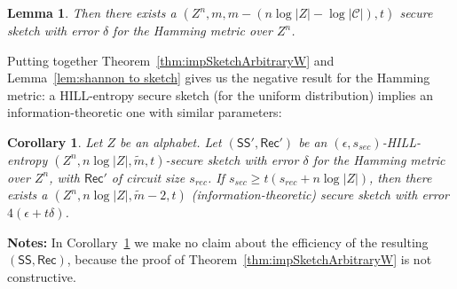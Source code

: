 \documentclass[11pt]{article}
\newcommand{\thref}[1]{\mbox{Theorem~\ref{#1}}}
\newcommand{\corref}[1]{\mbox{Corollary~\ref{#1}}}
\newcommand{\lemref}[1]{\mbox{Lemma~\ref{#1}}}
\newcommand{\class}[1]{{\ensuremath{\mathsf{#1}}}}
\newcommand{\sketch}{\ensuremath{\class{SS}}\xspace}
\newcommand{\rec}{\ensuremath{\class{Rec}}\xspace}
\newcommand{\hill}{\ensuremath{\mathtt{HILL}}\xspace}
\newcommand{\Hoo}{\mathrm{H}_\infty}
\newcommand{\Hav}{\tilde{\mathrm{H}}_\infty}
\newtheorem{lemma}[theorem]{Lemma}
\newtheorem{corollary}[theorem]{Corollary}
\newtheorem{construction}[theorem]{Construction}
\begin{document}
\begin{lemma}
Then there exists a $(Z^n, m, m-(n\log|Z|-\log |\mathcal{C}|), t)$ secure sketch with error $\delta$ for the Hamming metric over $Z^n$. 
\end{lemma}
Putting together \thref{thm:impSketchArbitraryW} and \lemref{lem:shannon to sketch} gives us the negative result for the Hamming metric: a HILL-entropy secure sketch (for the uniform distribution) implies an information-theoretic one with similar parameters:
\begin{corollary}
\label{cor:rec yields sketch}
Let $Z$ be an alphabet. Let $(\sketch', \rec')$ be an $(\epsilon,s_{sec})$-HILL-entropy $(Z^n, n\log |Z|, \tilde{m}, t)$-secure sketch with error $\delta$ for the Hamming metric over $Z^n$, with $\rec'$ of circuit size $s_{rec}$.
If $s_{sec}\geq t(s_{rec} + n\log |Z|)$, then there exists a   $(Z^n, n\log |Z|, \tilde{m}-2,t)$ (information-theoretic) secure sketch with error
$4(\epsilon+t\delta)$. 
\end{corollary}
\textbf{Notes:} In \corref{cor:rec yields sketch} we make no claim about the efficiency of the resulting  $(\sketch, \rec)$, because the proof of \thref{thm:impSketchArbitraryW} is not constructive.  
\end{document}

